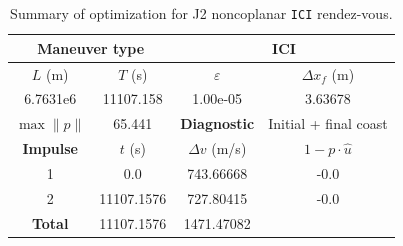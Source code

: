 \begin{table}[htpb]
    \centering
    \begin{tabular}{cccc} \toprule
    \multicolumn{2}{c}{\textbf{Maneuver type}} & \multicolumn{2}{c}{ICI} \\ \midrule
    \(L\) (m) & \(T\) (s) & \(\varepsilon\) & \(\Delta x_{f}\) (m)    \\ \midrule
    6.7631e6          & 11107.158          & 1.00e-05                & 3.63678                        \\ \midrule
    \(\max \lVert p \rVert\) & 65.441     & \textbf{Diagnostic}   & Initial + final coast        \\ \midrule
    \textbf{Impulse} & \(t\) (s) & \(\Delta v\) (m/s) & \(1 - p \cdot \hat{u}\) \\ \midrule
    1                 & 0.0          & 743.66668             & -0.0                    \\
    2                 & 11107.1576          & 727.80415             & -0.0                    \\\midrule
    \textbf{Total}   & 11107.1576          & 1471.47082             &                     \\ \bottomrule   
    \end{tabular}
    \caption{Summary of optimization for J2 noncoplanar \texttt{ICI} rendez-vous.}
    \label{tab:j2_ncop_ICI_tab}
\end{table}

